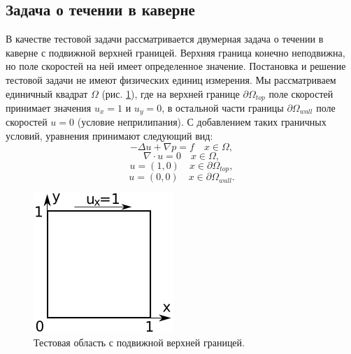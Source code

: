 \documentclass[12pt]{article}
\begin{document}
\subsection{Задача о течении в каверне}
В качестве тестовой задачи рассматривается двумерная задача о течении в каверне с подвижной верхней границей. Верхняя граница конечно неподвижна, но поле скоростей на ней имеет определенное значение. Постановка и решение тестовой задачи не имеют физических единиц измерения. Мы рассматриваем единичный квадрат $\Omega$ (рис. \ref{fg:cavity}), где на верхней границе $\partial\Omega_{top}$ поле скоростей принимает значения $u_x=1$ и $u_y=0$, в остальной части границы $\partial\Omega_{wall}$ поле скоростей $u=0$ (условие неприлипания).
С добавлением таких граничных условий, уравнения принимают следующий вид:
\begin{equation}
-\Delta u + \nabla p = f \quad x \in \Omega,
\end{equation}
\begin{equation}
\nabla\cdot u = 0 \quad x \in \Omega,
\end{equation}
\begin{equation}
u = (1, 0) \quad x \in \partial\Omega_{top},
\end{equation}
\begin{equation}
u = (0, 0) \quad x \in \partial\Omega_{wall}.
\end{equation}

\begin{figure}
	\begin{center}
		\includegraphics[width=200px]{pics/cavity400}
		\caption{Тестовая область с подвижной верхней границей.}
		\label{fg:cavity}
	\end{center}
\end{figure}
\end{document}
